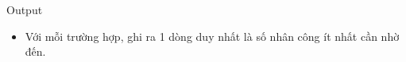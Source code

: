 Output
\begin{itemize}
	\item Với mỗi trường hợp, ghi ra 1 dòng duy nhất là số nhân công ít nhất cần nhờ đến.
\end{itemize}